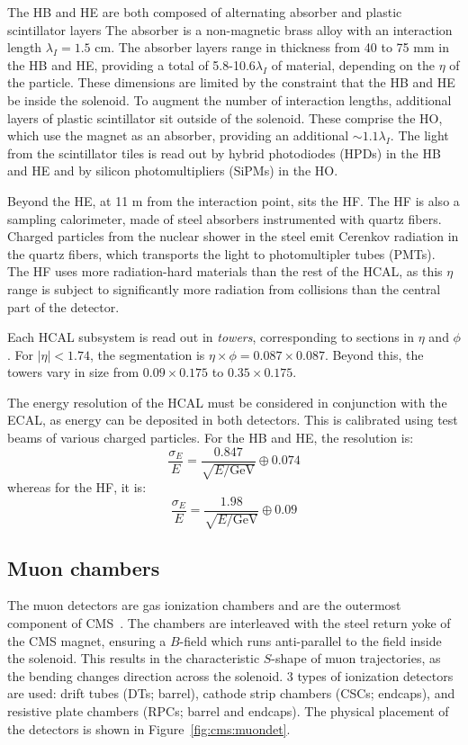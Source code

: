 The HB and HE are both composed of alternating absorber and plastic scintillator layers
The absorber is a non-magnetic brass alloy with an interaction length $\lambda_I=1.5$ cm.
The absorber layers range in thickness from 40 to 75 mm in the HB and HE, providing a total of 5.8-10.6$\lambda_I$ of material, depending on the $\eta$ of the particle.
These dimensions are limited by the constraint that the HB and HE be inside the solenoid. 
To augment the number of interaction lengths, additional layers of plastic scintillator sit outside of the solenoid.
These comprise the HO, which use the magnet as an absorber, providing an additional $\sim 1.1\lambda_I$.
The light from the scintillator tiles is read out by hybrid photodiodes (HPDs) in the HB and HE and by silicon photomultipliers (SiPMs) in the HO. 

Beyond the HE, at 11 m from the interaction point, sits the HF.
The HF is also a sampling calorimeter, made of steel absorbers instrumented with quartz fibers.
Charged particles from the nuclear shower in the steel emit Cerenkov radiation in the quartz fibers, which transports the light to photomultipler tubes (PMTs).
The HF uses more radiation-hard materials than the rest of the HCAL, as this $\eta$ range is subject to significantly more radiation from collisions than the central part of the detector. 

Each HCAL subsystem is read out in \emph{towers}, corresponding to sections in $\eta$ and $\phi$.
For $|\eta|<1.74$, the segmentation is $\eta\times\phi = 0.087\times0.087$.
Beyond this, the towers vary in size from $0.09\times0.175$  to $0.35\times0.175$.

The energy resolution of the HCAL must be considered in conjunction with the ECAL, as energy can be deposited in both detectors.
This is calibrated using test beams of various charged particles.
For the HB and HE, the resolution is:
\begin{equation}
	\frac{\sigma_E}{E} = \frac{0.847}{\sqrt{E/\mathrm{GeV}}} \oplus 0.074
\end{equation}
whereas for the HF, it is:
\begin{equation}
	\frac{\sigma_E}{E} = \frac{1.98}{\sqrt{E/\mathrm{GeV}}} \oplus 0.09
\end{equation}

\subsection{Muon chambers}

The muon detectors are gas ionization chambers and are the outermost component of CMS~\cite{cmsmuon}. 
The chambers are interleaved with the steel return yoke of the CMS magnet, ensuring a $B$-field which runs anti-parallel to the field inside the solenoid.
This results in the characteristic $S$-shape of muon trajectories, as the bending changes direction across the solenoid. 
3 types of ionization detectors are used: drift tubes (DTs; barrel), cathode strip chambers (CSCs; endcaps), and resistive plate chambers (RPCs; barrel and endcaps).
The physical placement of the detectors is shown in Figure~\ref{fig:cms:muondet}.

